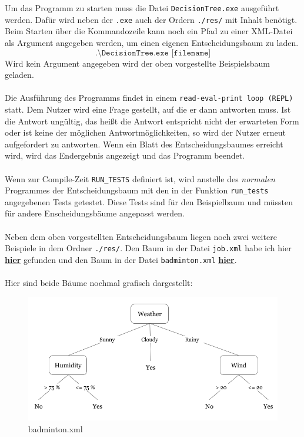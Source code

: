 \documentclass[a4paper,12pt]{article}
\begin{document}
Um das Programm zu starten muss die Datei \texttt{DecisionTree.exe} ausgeführt werden. Dafür wird neben der \texttt{.exe} auch der Ordern \texttt{./res/} mit Inhalt benötigt.
Beim Starten über die Kommandozeile kann noch ein Pfad zu einer XML-Datei als Argument angegeben werden, um einen eigenen Entscheidungsbaum zu laden. 
\[\texttt{.\textbackslash DecisionTree.exe [filename]}\]
Wird kein Argument angegeben wird der oben vorgestellte Beispielsbaum geladen.
\\
\\
Die Ausführung des Programms findet in einem \texttt{read-eval-print loop (REPL)} statt. Dem Nutzer wird eine Frage gestellt, auf die er dann antworten muss. Ist die Antwort ungültig, das heißt die Antwort entspricht nicht der erwarteten Form oder ist keine der möglichen Antwortmöglichkeiten, so wird der Nutzer erneut aufgefordert zu antworten. 
Wenn ein Blatt des Entscheidungsbaumes erreicht wird, wird das Endergebnis angezeigt und das Programm beendet.
\\
\\
Wenn zur Compile-Zeit \verb+RUN_TESTS+ definiert ist, wird anstelle des \emph{normalen} Programmes der Entscheidungsbaum mit den in der Funktion \verb+run_tests+ angegebenen Tests getestet. Diese Tests sind für den Beispielbaum und müssten für andere Enscheidungsbäume angepasst werden.  
\\
\\
Neben dem oben vorgestellten Entscheidungsbaum liegen noch zwei weitere Beispiele in dem Ordner \texttt{./res/}. Den Baum in der Datei \texttt{job.xml} habe ich hier \href{https://regenerativetoday.com/simple-explanation-on-how-decision-tree-algorithm-makes-decisions/}{\textbf{hier}} gefunden und den Baum in der Datei \texttt{badminton.xml} \href{https://www.hackerearth.com/practice/machine-learning/machine-learning-algorithms/ml-decision-tree/tutorial/}{\textbf{hier}}. 
\\
\\
Hier sind beide Bäume nochmal grafisch dargestellt:

\begin{figure}[h]
	\centering
	\includegraphics[width=\linewidth]{badminton.png}
	\caption{badminton.xml}
\end{figure}
\end{document}
